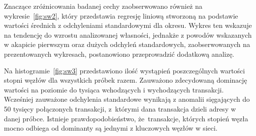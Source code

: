 \documentclass[12pt, twoside, final, openany]{mgr}
\begin{document}
\indent Znaczące zróżnicowania badanej cechy zaobserwowano również na wykresie~\ref{fig:sw2}, który przedstawia regresję liniową stworzoną na podstawie wartości średnich z odchyleniami standardowymi dla okresu. Wykres ten wskazuje na tendencję do wzrostu analizowanej własności, jednakże z powodów wskazanych w akapicie pierwszym oraz dużych odchyleń standardowych, zaobserwowanych na prezentowanych wykresach, postanowiono przeprowadzić dodatkową analizę.

\indent Na histogramie~\ref{fig:sw3} przedstawiono ilość wystąpień poszczególnych wartości stopni węzłów dla wszystkich próbek razem. Zauważono zdecydowaną dominację wartości na poziomie do tysiąca wchodzących i wychodzących transakcji. Wcześniej zauważone odchylenia standardowe wynikają z anomalii sięgających do 50 tysięcy połączonych transakcji, z~którymi dana transakcja dzieli adresy w danej próbce. Istnieje prawdopodobieństwo, że~transakcje, których stopień węzła mocno odbiega od dominanty są jednymi z kluczowych węzłów w sieci.
\end{document}
